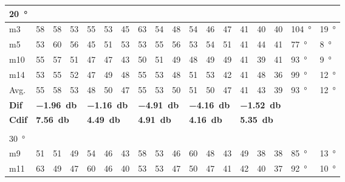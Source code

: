 \begin{table}[H]
\begin{tabular}{l|l|l|l|l|l|l|l|l|l|l|l|l|l|l|l|l|l}
\SI{20}{\degree}   & \multicolumn{3}{l|}{} & \multicolumn{3}{l|}{} & \multicolumn{3}{l|}{} & \multicolumn{3}{l|}{} &  \multicolumn{3}{l|}{}   &  \multicolumn{2}{l}{} \\  \hline
m3    &  58    &  58    &  53    &  55    &  53    &  45    &   63   &    54   &  48    &  54     &  46    &  47    & 41 & 40 &40  & \SI{104}{\degree} & \SI{19}{\degree}  \\
m5    &  53    &  60    &  56    &  45    &  51    & 53     &   53   &  55     &  56    &  53     &  54    &   51   & 41 & 44 &41   & \SI{77}{\degree} & \SI{8}{\degree} \\
m10  &  55    &  57    &  51    &  47    &   47   &   43   &   50   &   51    &   49   &  48     & 49     & 49     & 41 & 39 &41  & \SI{93}{\degree} & \SI{9}{\degree}  \\
m14  &  53    &  55    &  52    &  47    &  49    &   48   &    55  &  53     &   48   &  51     &  53    &  42    & 41 & 48 & 36  & \SI{99}{\degree} & \SI{12}{\degree} \\ \hline
Avg. & 55     &  58    &  53    &   48   &  50    &  47    &  55    &   53    &  50    &  51     & 50     &  47    & 41 & 43  & 39   & \SI{93}{\degree} & \SI{12}{\degree} \\ \hline  
\textbf{Dif} & \multicolumn{3}{l|}{\textbf{\SI{-1.96}{\decibel}}} & \multicolumn{3}{l|}{\textbf{\SI{-1.16}{\decibel}}} & \multicolumn{3}{l|}{\textbf{\SI{-4.91}{\decibel}}} & \multicolumn{3}{l|}{\textbf{\SI{-4.16}{\decibel}}} &  \multicolumn{3}{l|}{\textbf{\SI{-1.52}{\decibel}}} &  \multicolumn{2}{l}{}  \\ \hline 
\textbf{Cdif} & \multicolumn{3}{l|}{\textbf{\SI{7.56}{\decibel}}} & \multicolumn{3}{l|}{\textbf{\SI{4.49}{\decibel}}} & \multicolumn{3}{l|}{\textbf{\SI{4.91}{\decibel}}} & \multicolumn{3}{l|}{\textbf{\SI{4.16}{\decibel}}} & \multicolumn{3}{l|}{\textbf{\SI{5.35}{\decibel}}}  &   \multicolumn{2}{l}{}   \\ 
 \multicolumn{18}{l}{ } \\                         
\SI{30}{\degree}   & \multicolumn{3}{l|}{} & \multicolumn{3}{l|}{} & \multicolumn{3}{l|}{} & \multicolumn{3}{l|}{} &  \multicolumn{3}{l|}{}   &  \multicolumn{2}{l}{} \\  \hline
m9    &  51    &  51    &  49    &  54    &  46    &   43   &  58    &   53    &  46    &   60    &   48   &   43   & 49 & 38 & 38  & \SI{85}{\degree} & \SI{13}{\degree} \\
m11  &  63    &  49    &  47    &   60   &   46   &   40   &  53    &   53    &  47    &    50   &   47   &  41   & 42 & 40 & 37  & \SI{92}{\degree} & \SI{10}{\degree} \\

\end{tabular}
\end{table}
